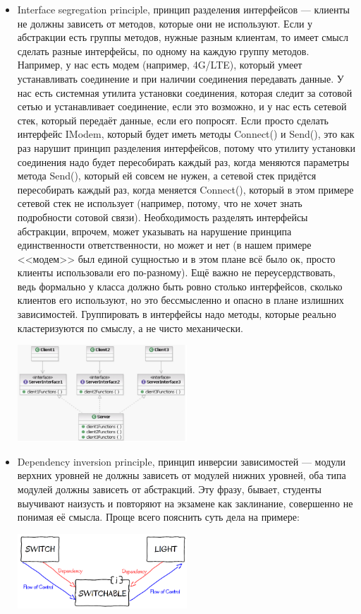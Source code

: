 \documentclass{../../text-style}
\begin{document}
\begin{itemize}
    \item Interface segregation principle, принцип разделения интерфейсов --- клиенты не должны зависеть от методов, которые они не используют. Если у абстракции есть группы методов, нужные разным клиентам, то имеет смысл сделать разные интерфейсы, по одному на каждую группу методов. Например, у нас есть модем (например, 4G/LTE), который умеет устанавливать соединение и при наличии соединения передавать данные. У нас есть системная утилита установки соединения, которая следит за сотовой сетью и устанавливает соединение, если это возможно, и у нас есть сетевой стек, который передаёт данные, если его попросят. Если просто сделать интерфейс IModem, который будет иметь методы Connect() и Send(), это как раз нарушит принцип разделения интерфейсов, потому что утилиту установки соединения надо будет пересобирать каждый раз, когда меняются параметры метода Send(), который ей совсем не нужен, а сетевой стек придётся пересобирать каждый раз, когда меняется Connect(), который в этом примере сетевой стек не использует (например, потому, что не хочет знать подробности сотовой связи). Необходимость разделять интерфейсы абстракции, впрочем, может указывать на нарушение принципа единственности ответственности, но может и нет (в нашем примере <<модем>> был единой сущностью и в этом плане всё было ок, просто клиенты использовали его по-разному). Ещё важно не переусердствовать, ведь формально у класса должно быть ровно столько интерфейсов, сколько клиентов его используют, но это бессмысленно и опасно в плане излишних зависимостей. Группировать в интерфейсы надо методы, которые реально кластеризуются по смыслу, а не чисто механически.
        \begin{center}
            \includegraphics[width=0.5\textwidth]{interfaceSegregationPrinciple.png}
        \end{center}
    \item Dependency inversion principle, принцип инверсии зависимостей --- модули верхних уровней не должны зависеть от модулей нижних уровней, оба типа модулей должны зависеть от абстракций. Эту фразу, бывает, студенты выучивают наизусть и повторяют на экзамене как заклинание, совершенно не понимая её смысла. Проще всего пояснить суть дела на примере:
        \begin{center}
            \includegraphics[width=0.5\textwidth]{dependencyInversionPrinciple.png}
        \end{center}


\end{itemize}
\end{document}
